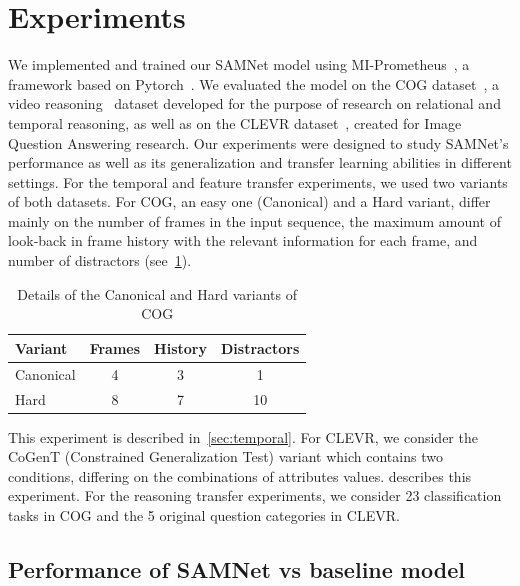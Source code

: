 \section{Experiments}
\label{sec:experiments}
We implemented and trained our SAMNet model using MI-Prometheus~\cite{kornuta2018accelerating}, a framework based on Pytorch~\cite{paszke2017automatic}. We evaluated the model on the COG dataset~\cite{yang2018dataset}, a video reasoning~\cite{mogadala2019trends} dataset developed for the purpose of research on relational and temporal reasoning, as well as on the CLEVR dataset~\cite{johnson2017clevr}, created for Image Question Answering research.
Our experiments were designed to study SAMNet's performance as well as its generalization and transfer learning abilities in different settings.
For the temporal and feature transfer experiments, we used two variants of both datasets.
For COG, an easy one (Canonical) and a Hard variant, differ mainly on the number of frames in the input sequence,
the maximum amount of look-back in frame history with the relevant information for each frame,  and number of 
distractors (see~\cref{tab:cog_variants}).
\begin{table}[ht]
	\centering
		\begin{tabular}{lccc}
			\toprule
			Variant	& Frames & History	& Distractors \\ 
			\midrule
			Canonical & 4 & 3 & 1\\	
			Hard  & 8 & 7 & 10\\
			\bottomrule	
		\end{tabular}
	\caption{Details of the Canonical and Hard variants of COG}
	\label{tab:cog_variants}
\end{table}
This experiment is described in~\cref{sec:temporal}.
For CLEVR, we consider the CoGenT (Constrained Generalization Test) variant which contains two conditions, differing on the combinations of attributes values.
 describes this experiment.
For the reasoning transfer experiments, we consider 23 classification tasks in COG and the 5 original question categories in CLEVR.

\subsection{Performance of SAMNet vs baseline model~\cite{yang2018dataset}}
\label{sec:cog-baseline-compare}

